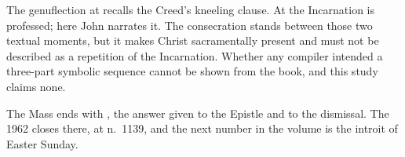 The genuflection at  recalls the Creed's
kneeling clause. At  the Incarnation is professed;
here John narrates it. The consecration stands between those two textual
moments, but it makes Christ sacramentally present and must not be described as
a repetition of the Incarnation. Whether any compiler intended a three-part
symbolic sequence cannot be shown from the book, and this study claims none.

The Mass ends with , the answer given to the Epistle and
to the dismissal. The 1962  closes there, at n.~1139, and the
next number in the volume is the introit of Easter Sunday.
